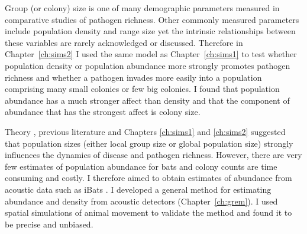 
Group (or colony) size is one of many demographic parameters measured in comparative studies of pathogen richness.
Other commonly measured parameters include population density and range size \cite{kamiya2014determines, nunn2003comparative, morand1998density, lindenfors2007parasite, gay2014parasite, ezenwa2006host} yet the intrinsic relationships between these variables are rarely acknowledged or discussed.
Therefore in Chapter~\ref{ch:sims2} I used the same model as Chapter~\ref{ch:sims1} to test whether population density or population abundance more strongly promotes pathogen richness and whether a pathogen invades more easily into a population comprising many small colonies or few big colonies.
I found that population abundance has a much stronger affect than density and that the component of abundance that has the strongest affect is colony size.



Theory \cite{may1979population, anderson1979population}, previous literature \cite{kamiya2014determines, nunn2003comparative, morand1998density} and Chapters \ref{ch:sims1} and \ref{ch:sims2} suggested that population sizes (either local group size or global population size) strongly influences the dynamics of disease and pathogen richness.
However, there are very few estimates of population abundance for bats and colony counts are time consuming and costly.
I therefore aimed to obtain estimates of abundance from acoustic data such as iBats \cite{jones2011indicator}.
I developed a general method for estimating abundance and density from acoustic detectors (Chapter~\ref{ch:grem}).
I used spatial simulations of animal movement to validate the method and found it to be precise and unbiased.

